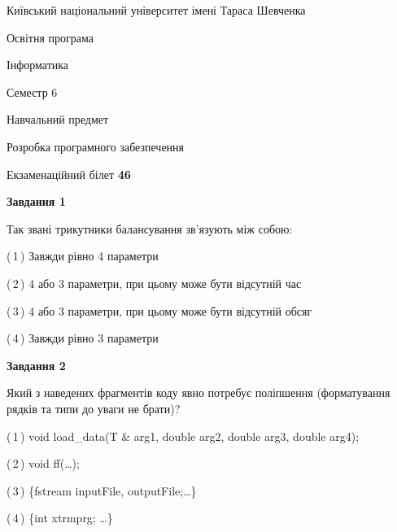 \documentclass[10pt, ukrainian]{article}
\begin{document}
{{\begin {small}\par
{ \center  Київський національний університет імені Тараса Шевченка \par}
{\parbox {5 cm}{Освітня програма \hfill}{\parbox {7 cm}{Інформатика \hfill}}\parbox {6 cm}{\hfill Семестр 6}}\par
{\parbox {5 cm} {Навчальний предмет \hfill}\parbox {7 cm}{Розробка програмного забезпечення \hfill}\parbox {6cm}{\hfill}\par}\vspace{-7pt} \end{small}}{\center Екзаменаційний білет \No \textbf
{ 46 }\par}}
{
\begin {large}
{\begin {center}\textbf{Завдання 1}\end {center}}\par
Так звані трикутники балансування зв'язують між собою:\par
\vspace{2mm}



(\,1\,) Завжди рівно 4 параметри%



(\,2\,) 4 або 3 параметри, при цьому може бути відсутній час%



(\,3\,) 4 або 3 параметри, при цьому може бути відсутній обсяг %



(\,4\,) Завжди рівно 3 параметри%


{\begin {center}\textbf{Завдання 2}\end {center}}\par
Який з наведених фрагментів коду явно потребує поліпшення (форматування рядків та типи до уваги не брати)?\par
\vspace{2mm}



(\,1\,) void load\_data(T \& arg1, double arg2, double arg3, double arg4); %



(\,2\,) void ff(…);%



(\,3\,) \{fstream inputFile, outputFile;…\} %



(\,4\,) \{int xtrmprg; …\}%



\end{large}}
\end{document}
